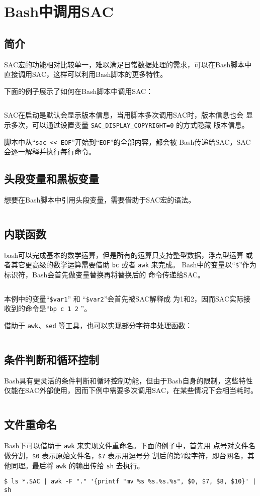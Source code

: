 \section{Bash中调用SAC}
\label{sec:sac-bash}

\subsection{简介}
SAC宏的功能相对比较单一，难以满足日常数据处理的需求，可以在Bash脚本中
直接调用SAC，这样可以利用Bash脚本的更多特性。

下面的例子展示了如何在Bash脚本中调用SAC：
\inputminted{bash}{./call-in-script/simple-script.sh}

SAC在启动是默认会显示版本信息，当用脚本多次调用SAC时，版本信息也会
显示多次，可以通过设置变量 \verb|SAC_DISPLAY_COPYRIGHT=0| 的方式隐藏
版本信息。

脚本中从``\texttt{sac << EOF}''开始到``\texttt{EOF}''的全部内容，都会被
Bash传递给SAC，SAC会逐一解释并执行每行命令。

\subsection{头段变量和黑板变量}
想要在Bash脚本中引用头段变量，需要借助于SAC宏的语法。
\inputminted{bash}{./call-in-script/variables.sh}

\subsection{内联函数}
bash可以完成基本的数学运算，但是所有的运算只支持整型数据，浮点型运算
或者其它更高级的数学运算需要借助 \texttt{bc} 或者 \texttt{awk} 来完成。
Bash中的变量以``\verb|$|''作为标识符，Bash会首先做变量替换再将替换后的
命令传递给SAC。
\inputminted{bash}{./call-in-script/arithmetic-functions.sh}

本例中的变量``\verb|$var1|'' 和 ``\verb|$var2|''会首先被SAC解释成
为1和2，因而SAC实际接收到的命令是``\texttt{bp c 1 2} ''。

借助于 \texttt{awk}、\texttt{sed} 等工具，也可以实现部分字符串处理函数：
\inputminted{bash}{./call-in-script/string-functions.sh}

\subsection{条件判断和循环控制}
Bash具有更灵活的条件判断和循环控制功能，但由于Bash自身的限制，这些特性
仅能在SAC外部使用，因而下例中需要多次调用SAC，在某些情况下会相当耗时。
\inputminted{bash}{./call-in-script/do-loops.sh}

\subsection{文件重命名}
\label{subsec:rename-in-bash}
Bash下可以借助于 \texttt{awk} 来实现文件重命名。下面的例子中，首先用
点号对文件名做分割，\verb|$0| 表示原始文件名，\verb|$7| 表示用逗号分
割后的第7段字符，即台网名，其他同理。最后将 \texttt{awk} 的输出传给
\texttt{sh} 去执行。
\begin{verbatim}
$ ls *.SAC | awk -F "." '{printf "mv %s %s.%s.%s", $0, $7, $8, $10}' | sh
\end{verbatim}
